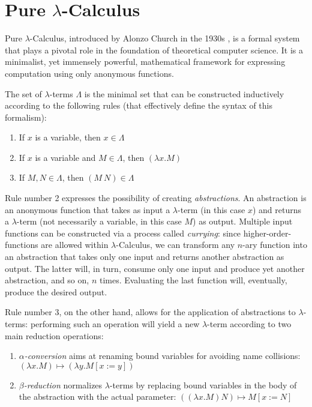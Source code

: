 \documentclass{article}
\begin{document}
\section{Pure $\lambda$-Calculus} \label{sec:lambdaintro}

Pure $\lambda$-Calculus, introduced by Alonzo Church in the 1930s \cite{church}, is a formal system that plays a pivotal role in the foundation of theoretical computer science. It is a minimalist, yet immensely powerful, mathematical framework for expressing computation using only anonymous functions.

The set of $\lambda$-terms $\Lambda$ is the minimal set that can be constructed inductively according to the following rules (that effectively define the syntax of this formalism):

\begin{enumerate}
    \item If $x$ is a variable, then $x \in \Lambda$
    \item If $x$ is a variable and $M \in \Lambda$, then $(\lambda x . M)$
    \item If $M,N \in \Lambda$, then $(M\ N) \in \Lambda$
\end{enumerate}

Rule number 2 expresses the possibility of creating \textit{abstractions}. An abstraction is an anonymous function that takes as input a $\lambda$-term (in this case $x$) and returns a $\lambda$-term (not necessarily a variable, in this case $M$) as output. Multiple input functions can be constructed via a process called \textit{currying}: since higher-order-functions are allowed within $\lambda$-Calculus, we can transform any $n$-ary function into an abstraction that takes only one input and returns another abstraction as output. The latter will, in turn, consume only one input and produce yet another abstraction, and so on, $n$ times. Evaluating the last function will, eventually, produce the desired output.

Rule number 3, on the other hand, allows for the application of abstractions to $\lambda$-terms: performing such an operation will yield a new $\lambda$-term according to two main reduction operations:

\begin{enumerate}
    \item \textit{$\alpha$-conversion} aims at renaming bound variables for avoiding name collisions: $(\lambda x . M) \mapsto (\lambda y . M[x := y])$
    \item \textit{$\beta$-reduction} normalizes $\lambda$-terms by replacing bound variables in the body of the abstraction with the actual parameter: $((\lambda x . M) N) \mapsto M[x := N]$
\end{enumerate}
\end{document}
